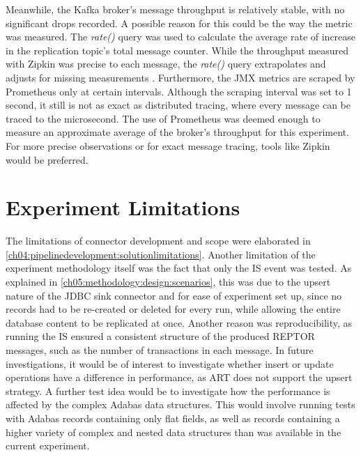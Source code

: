 Meanwhile, the Kafka broker's message throughput is relatively stable, with no significant drops recorded. A possible reason for this could be the way the metric was measured. The \textit{rate()} query was used to calculate the average rate of increase in the replication topic's total message counter. While the throughput measured with Zipkin was precise to each message, the \textit{rate()} query extrapolates and adjusts for missing measurements \cite{prometheusquery}. Furthermore, the \ac{JMX} metrics are scraped by Prometheus only at certain intervals. Although the scraping interval was set to 1 second, it still is not as exact as distributed tracing, where every message can be traced to the microsecond. The use of Prometheus was deemed enough to measure an approximate average of the broker's throughput for this experiment. For more precise observations or for exact message tracing, tools like Zipkin would be preferred.

\section{Experiment Limitations}
The limitations of connector development and scope were elaborated in \ref{ch04:pipelinedevelopment:solutionlimitations}. Another limitation of the experiment methodology itself was the fact that only the \ac{IS} event was tested. As explained in \ref{ch05:methodology:design:scenarios}, this was due to the upsert nature of the \ac{JDBC} sink connector and for ease of experiment set up, since no records had to be re-created or deleted for every run, while allowing the entire database content to be replicated at once. Another reason was reproducibility, as running the \ac{IS} ensured a consistent structure of the produced \ac{REPTOR} messages, such as the number of transactions in each message. In future investigations, it would be of interest to investigate whether insert or update operations have a difference in performance, as \ac{ART} does not support the upsert strategy. A further test idea would be to investigate how the performance is affected by the complex Adabas data structures. This would involve running tests with Adabas records containing only flat fields, as well as records containing a higher variety of complex and nested data structures than was available in the current experiment.